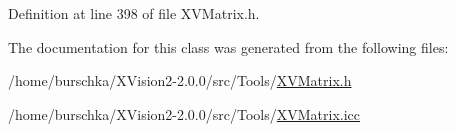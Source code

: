 Definition at line 398 of file XVMatrix.h.

The documentation for this class was generated from the following files:\begin{CompactItemize}
\item 
/home/burschka/XVision2-2.0.0/src/Tools/\hyperlink{XVMatrix.h-source}{XVMatrix.h}\item 
/home/burschka/XVision2-2.0.0/src/Tools/\hyperlink{XVMatrix.icc-source}{XVMatrix.icc}\end{CompactItemize}
